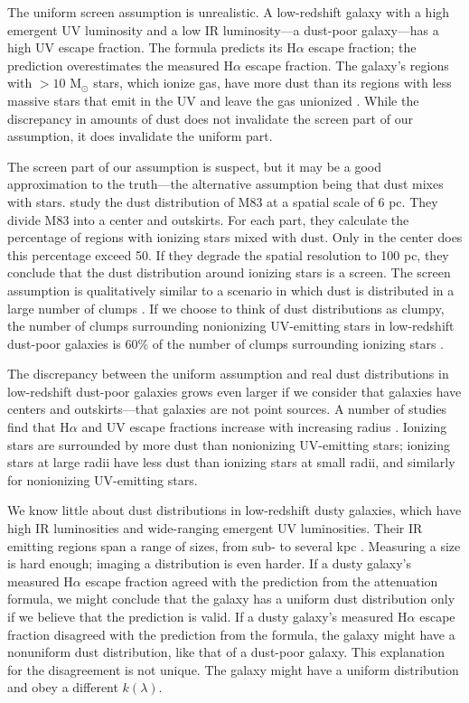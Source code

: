\documentclass[referee]{aa}
\begin{document}
The uniform screen assumption is unrealistic.  A low-redshift galaxy with a
high emergent UV luminosity and a low IR luminosity---a dust-poor
galaxy---has a high UV escape fraction.  The \citet{calzetti00} formula
predicts its H$\alpha$ escape fraction; the prediction
overestimates the measured H$\alpha$ escape fraction.  The galaxy's regions with
$>10$ M$_{\odot}$ stars, which ionize gas, have more dust than its regions
with less massive stars that emit in the UV and leave the gas unionized
\citep{calzetti94,calzetti97b}.  While the discrepancy in amounts of dust does
not invalidate the screen part of our assumption, it does invalidate the
uniform part.

The screen part of our assumption is suspect, but it may be a
good approximation to the truth---the alternative assumption being that dust
mixes with stars.  \citet{liu13} study the dust distribution of M83 at a
spatial scale of 6 pc.  They divide M83 into a center and outskirts.  For each
part, they calculate the percentage of regions with ionizing stars mixed with
dust.  Only in the center does this percentage exceed 50.  If they degrade the
spatial resolution to 100 pc, they conclude that the dust distribution around
ionizing stars is a screen.  The screen assumption is qualitatively similar to
a scenario in which dust is distributed in a large number of clumps
\citep{calzetti94}.  If we choose to think of dust distributions as clumpy, the
number of clumps surrounding nonionizing UV-emitting stars in low-redshift
dust-poor galaxies is 60\% of the number of clumps surrounding ionizing stars
\citep{calzetti97a}.

The discrepancy between the uniform assumption and real dust
distributions in low-redshift dust-poor galaxies grows even larger if we
consider that galaxies have centers and outskirts---that galaxies are not
point sources.  A number of studies find
that H$\alpha$ and UV escape fractions increase with increasing radius
\citep{boissier04,prescott07,munoz09}.  Ionizing stars are surrounded by more
dust than nonionizing UV-emitting stars; ionizing stars
at large radii have less dust than ionizing stars at small radii, and similarly
for nonionizing UV-emitting stars.

We know little about dust distributions in low-redshift dusty galaxies, which
have high IR luminosities and wide-ranging emergent UV luminosities.  Their
IR emitting regions span a range of sizes, from sub- to several kpc
\citep{diaz10}.  Measuring a size is hard enough; imaging a distribution is
even harder.  If a dusty galaxy's measured H$\alpha$ escape fraction agreed with
the prediction from the \citet{calzetti00} attenuation formula, we might
conclude that the galaxy has a uniform dust distribution only if we believe
that the prediction is valid.  If a dusty galaxy's measured H$\alpha$
escape fraction disagreed with the prediction from the \citet{calzetti00}
formula, the galaxy might have a nonuniform dust distribution, like that of a
dust-poor galaxy.  This explanation for the disagreement is not unique.  The
galaxy might have a uniform distribution and obey a different $k(\lambda)$.
\end{document}
